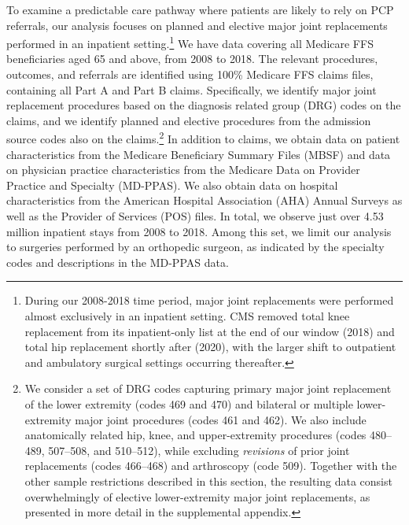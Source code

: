 \documentclass[12pt]{article}
\begin{document}
To examine a predictable care pathway where patients are likely to rely on PCP referrals, our analysis focuses on planned and elective major joint replacements performed in an inpatient setting.\footnote{During our 2008-2018 time period, major joint replacements were performed almost exclusively in an inpatient setting. CMS removed total knee replacement from its inpatient-only list at the end of our window (2018) and total hip replacement shortly after (2020), with the larger shift to outpatient and ambulatory surgical settings occurring thereafter.} We have data covering all Medicare FFS beneficiaries aged 65 and above, from 2008 to 2018. The relevant procedures, outcomes, and referrals are identified using 100\% Medicare FFS claims files, containing all Part A and Part B claims. Specifically, we identify major joint replacement procedures based on the diagnosis related group (DRG) codes on the claims, and we identify planned and elective procedures from the admission source codes also on the claims.\footnote{We consider a set of DRG codes capturing primary major joint replacement of the lower extremity (codes 469 and 470) and bilateral or multiple lower-extremity major joint procedures (codes 461 and 462). We also include anatomically related hip, knee, and upper-extremity procedures (codes 480--489, 507--508, and 510--512), while excluding \textit{revisions} of prior joint replacements (codes 466--468) and arthroscopy (code 509). Together with the other sample restrictions described in this section, the resulting data consist overwhelmingly of elective lower-extremity major joint replacements, as presented in more detail in the supplemental appendix.} In addition to claims, we obtain data on patient characteristics from the Medicare Beneficiary Summary Files (MBSF) and data on physician practice characteristics from the Medicare Data on Provider Practice and Specialty (MD-PPAS). We also obtain data on hospital characteristics from the American Hospital Association (AHA) Annual Surveys as well as the Provider of Services (POS) files. In total, we observe just over 4.53 million inpatient stays from 2008 to 2018. Among this set, we limit our analysis to surgeries performed by an orthopedic surgeon, as indicated by the specialty codes and descriptions in the MD-PPAS data.
\end{document}
